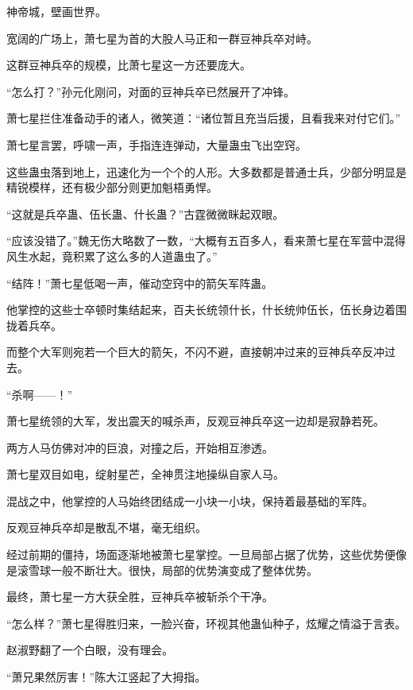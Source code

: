 
\begin{this_body}



神帝城，壁画世界。

宽阔的广场上，萧七星为首的大股人马正和一群豆神兵卒对峙。

这群豆神兵卒的规模，比萧七星这一方还要庞大。

“怎么打？”孙元化刚问，对面的豆神兵卒已然展开了冲锋。

萧七星拦住准备动手的诸人，微笑道：“诸位暂且充当后援，且看我来对付它们。”

萧七星言罢，呼啸一声，手指连连弹动，大量蛊虫飞出空窍。

这些蛊虫落到地上，迅速化为一个个的人形。大多数都是普通士兵，少部分明显是精锐模样，还有极少部分则更加魁梧勇悍。

“这就是兵卒蛊、伍长蛊、什长蛊？”古霆微微眯起双眼。

“应该没错了。”魏无伤大略数了一数，“大概有五百多人，看来萧七星在军营中混得风生水起，竟积累了这么多的人道蛊虫了。”

“结阵！”萧七星低喝一声，催动空窍中的箭矢军阵蛊。

他掌控的这些士卒顿时集结起来，百夫长统领什长，什长统帅伍长，伍长身边着围拢着兵卒。

而整个大军则宛若一个巨大的箭矢，不闪不避，直接朝冲过来的豆神兵卒反冲过去。

“杀啊——！”

萧七星统领的大军，发出震天的喊杀声，反观豆神兵卒这一边却是寂静若死。

两方人马仿佛对冲的巨浪，对撞之后，开始相互渗透。

萧七星双目如电，绽射星芒，全神贯注地操纵自家人马。

混战之中，他掌控的人马始终团结成一小块一小块，保持着最基础的军阵。

反观豆神兵卒却是散乱不堪，毫无组织。

经过前期的僵持，场面逐渐地被萧七星掌控。一旦局部占据了优势，这些优势便像是滚雪球一般不断壮大。很快，局部的优势演变成了整体优势。

最终，萧七星一方大获全胜，豆神兵卒被斩杀个干净。

“怎么样？”萧七星得胜归来，一脸兴奋，环视其他蛊仙种子，炫耀之情溢于言表。

赵淑野翻了一个白眼，没有理会。

“萧兄果然厉害！”陈大江竖起了大拇指。


\end{this_body}
